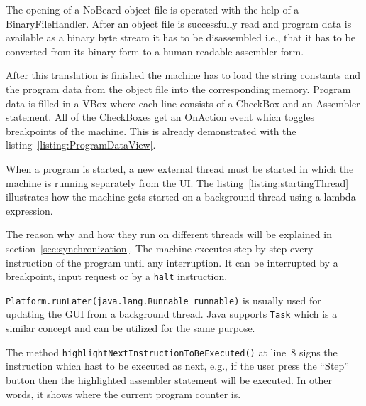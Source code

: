 The opening of a NoBeard object file is operated with the help of a BinaryFileHandler. After an object file is successfully read and program data is available as a binary byte stream it has to be disassembled i.e., that it has to be converted from its binary form to a human readable assembler form.

After this translation is finished the machine has to load the string constants and the program data from the object file into the corresponding memory. Program data is filled in a VBox where each line consists of a CheckBox and an Assembler statement. All of the CheckBoxes get an OnAction event which toggles breakpoints of the machine. This is already demonstrated with the listing~\ref{listing:ProgramDataView}.

When a program is started, a new external thread must be started in which the machine is running separately from the UI. The listing~\ref{listing:startingThread} illustrates how the machine gets started on a background thread using a lambda expression.

The reason why and how they run on different threads will be explained in section~\ref{sec:synchronization}. The machine executes step by step every instruction of the program until any interruption. It can be interrupted by a breakpoint, input request or by a \lstinline$halt$ instruction. 

\texttt{Platform.runLater(java.lang.Runnable runnable)} is usually used for updating the GUI from a background thread. Java supports \texttt{Task} which is a similar concept and can be utilized for the same purpose. 

The method \texttt{highlightNextInstructionToBeExecuted()} at line~8 signs the instruction which hast to be executed as next, e.g., if the user press the ``Step'' button then the highlighted assembler statement will be executed. In other words, it shows where the current program counter is.

